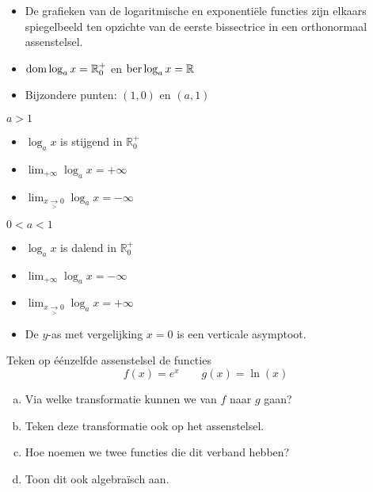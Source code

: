 \documentclass[12pt,twoside,a4paper]{article}
\begin{document}
\begin{itemize}
  \item De grafieken van de logaritmische en exponentiële functies zijn elkaars spiegelbeeld ten opzichte van de eerste bissectrice in een orthonormaal assenstelsel.
  \item $\dom \log_a x = \mathbb{R}^+_0$ en $\ber \log_a x = \mathbb{R}$
  \item Bijzondere punten: $(1, 0)$ en $(a, 1)$\\
\end{itemize}
\begin{minipage}{0.5\textwidth}
  \centering $a>1$
  \begin{itemize}
    \item $\log_a x$ is stijgend in $\mathbb{R}^+_0$
    \item $\lim_{+\infty} \log_a x = +\infty$
    \item $\lim_{x\underset{>}{\to}0} \log_a x = -\infty$
  \end{itemize}
\end{minipage}\vline
\begin{minipage}{0.5\textwidth}
  \centering $0<a<1$
  \begin{itemize}
    \item $\log_a x$ is dalend in $\mathbb{R}^+_0$
    \item $\lim_{+\infty} \log_a x = -\infty$
    \item $\lim_{x\underset{>}{\to}0} \log_a x = +\infty$
  \end{itemize}
\end{minipage}
\begin{itemize}
  \item De $y$-as met vergelijking $x=0$ is een verticale asymptoot.
\end{itemize}

\begin{oefening}
Teken op éénzelfde assenstelsel de functies
$$f(x)=e^x\qquad g(x)=\ln(x)$$
\begin{enumerate}[(a)]
  \item Via welke transformatie kunnen we van $f$ naar $g$ gaan?
  \item Teken deze transformatie ook op het assenstelsel.
  \item Hoe noemen we twee functies die dit verband hebben?
  \item Toon dit ook algebraïsch aan.
\end{enumerate}
\end{oefening}
\end{document}
